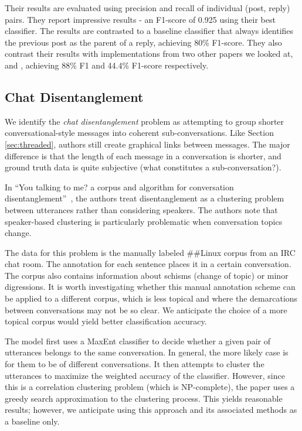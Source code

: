 \documentclass[11pt]{article}
\newcommand{\titlecite}[2]{``#1''~\cite{#2}}
\begin{document}
Their results are evaluated using precision and recall of individual
(post, reply) pairs. They report impressive results - an F1-score of 0.925 using their best
classifier. The results are contrasted to a baseline classifier that always
identifies the previous post as the parent of a reply, achieving 80\% F1-score. 
They also contrast their results with implementations from two other papers we looked at,
\cite{Elsner2008a} and \cite{Wang2008a}, achieving 88\% F1 and 44.4\% F1-score
respectively.

\subsection{Chat Disentanglement}
\label{sec:chat}
We identify the \textit{chat disentanglement} problem as attempting to group
shorter conversational-style messages into coherent sub-conversations. Like 
Section \ref{sec:threaded}, authors still create graphical links between messages. The major
difference is that the length of each message in a conversation is shorter, and ground truth
data is quite subjective (what constitutes a sub-conversation?).

In \titlecite{You talking to me? a corpus and algorithm for conversation
disentanglement}{Elsner2008a}, the authors treat disentanglement as a clustering problem between 
utterances rather than considering speakers. The authors note that speaker-based clustering is
particularly problematic when conversation topics change.

The data for this problem is the manually labeled \#\#Linux corpus from an IRC
chat room. The annotation for each sentence places it in a certain conversation.
The corpus also contains information about schisms (change of topic) or minor
digressions. It is worth investigating whether this manual annotation scheme can
be applied to a different corpus, which is less topical and where the
demarcations between conversations may not be so clear. We anticipate the choice
of a more topical corpus would yield better classification accuracy.

The model first uses a MaxEnt classifier to decide whether a given pair of
utterances belongs to the same conversation. In general, the more likely case is
for them to be of different conversations. It then attempts to cluster the
utterances to maximize the weighted accuracy of the classifier. However, since
this is a correlation clustering problem (which is NP-complete), the paper uses
a greedy search approximation to the clustering process. This yields reasonable
results; however, we anticipate using this approach and its associated methods
as a baseline only.
\end{document}

